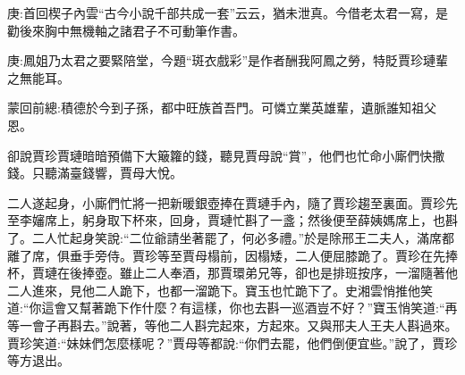 

\begin{parag}
    \begin{note}庚:首回楔子內雲“古今小說千部共成一套”云云，猶未泄真。今借老太君一寫，是勸後來胸中無機軸之諸君子不可動筆作書。\end{note}
\end{parag}


\begin{parag}
    \begin{note}庚:鳳姐乃太君之要緊陪堂，今題“斑衣戲彩”是作者酬我阿鳳之勞，特貶賈珍璉輩之無能耳。\end{note}
\end{parag}


\begin{parag}
    \begin{note}蒙回前總:積德於今到子孫，都中旺族首吾門。可憐立業英雄輩，遺脈誰知祖父恩。\end{note}
\end{parag}


\begin{parag}
    卻說賈珍賈璉暗暗預備下大簸籮的錢，聽見賈母說“賞”，他們也忙命小廝們快撒錢。只聽滿臺錢響，賈母大悅。
\end{parag}


\begin{parag}
    二人遂起身，小廝們忙將一把新暖銀壺捧在賈璉手內，隨了賈珍趨至裏面。賈珍先至李嬸席上，躬身取下杯來，回身，賈璉忙斟了一盞；然後便至薛姨媽席上，也斟了。二人忙起身笑說:“二位爺請坐著罷了，何必多禮。”於是除邢王二夫人，滿席都離了席，俱垂手旁侍。賈珍等至賈母榻前，因榻矮，二人便屈膝跪了。賈珍在先捧杯，賈璉在後捧壺。雖止二人奉酒，那賈環弟兄等，卻也是排班按序，一溜隨著他二人進來，見他二人跪下，也都一溜跪下。寶玉也忙跪下了。史湘雲悄推他笑道:“你這會又幫著跪下作什麼？有這樣，你也去斟一巡酒豈不好？”寶玉悄笑道:“再等一會子再斟去。”說著，等他二人斟完起來，方起來。又與邢夫人王夫人斟過來。賈珍笑道:“妹妹們怎麼樣呢？”賈母等都說:“你們去罷，他們倒便宜些。”說了，賈珍等方退出。
\end{parag}


